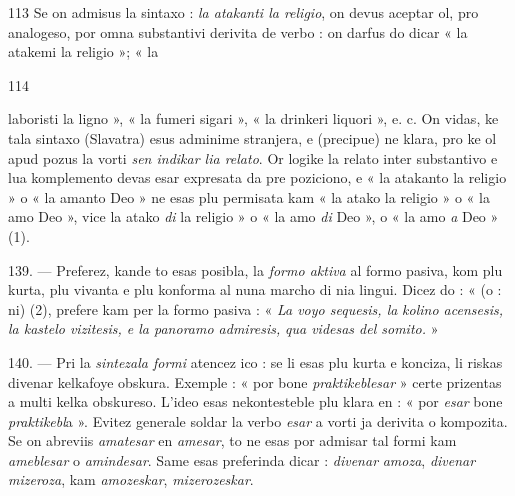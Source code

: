 \begin{VUpage}[117]{113}
Se on admisus la sintaxo : \textit{la atakanti la religio}, on devus\nl
aceptar ol, pro analogeso, por omna substantivi derivita de\nl
verbo : on darfus do dicar « la atakemi la religio »; « la\parplein
\end{VUpage}

\begin{VUpage}[118]{114}
\VUornement{147.14mm}

\VUcontinue
laboristi la ligno », « la fumeri sigari », « la drinkeri\nl
liquori », e. c. On vidas, ke tala sintaxo (Slavatra) esus\nl
adminime stranjera, e (precipue) ne klara, pro ke ol apud\cc
pozus la vorti \textit{sen indikar lia relato}. Or logike la relato inter\nl
substantivo e lua komplemento devas esar expresata da pre\cc
poziciono, e « la atakanto la religio » o « la amanto Deo »\nl
ne esas plu permisata kam « la atako la religio » o « la\nl
amo Deo », vice la atako \textit{di} la religio » o « la amo \textit{di} Deo »,\nl
o « la amo \textit{a} Deo » (1).

\VUblanc{5.93pt}%
139. --- Preferez, kande to esas posibla, la \textit{formo aktiva}\nl
al formo pasiva, kom plu kurta, plu vivanta e plu konforma\nl
al nuna marcho di nia lingui. Dicez do : «  (o : ni)\nl
{}\cc
{} (2),\nl
prefere kam per la formo pasiva : « \textit{La voyo sequesis, la}\nl
\textit{kolino acensesis, la kastelo vizitesis, e la panoramo admiresis,}\nl
\textit{qua videsas del somito.} »

\VUblanc{5.85pt}%
140. --- Pri la \textit{sintezala formi} atencez ico : se li esas plu\nl
kurta e konciza, li riskas divenar kelkafoye obskura.\nl
Exemple : « por bone \textit{praktikeblesar} » certe prizentas a\nl
multi kelka obskureso. L'ideo esas nekontesteble plu klara\nl
en : « por \textit{esar} bone \textit{praktikebl}a ». Evitez generale soldar\nl
la verbo \textit{esar} a vorti ja derivita o kompozita. Se on abreviis\nl
\textit{amatesar} en \textit{amesar}, to ne esas por admisar tal formi kam\nl
\textit{ameblesar} o \textit{amindesar}. Same esas preferinda dicar : \textit{divenar}\nl
\textit{amoza}, \textit{divenar mizeroza}, kam \textit{amozeskar}, \textit{mizerozeskar}.
\end{VUpage}
